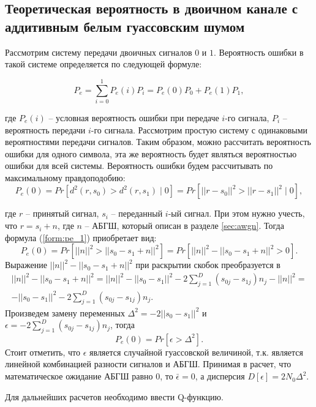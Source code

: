 \subsection{Теоретическая вероятность в двоичном канале с аддитивным белым гуассовским шумом}

Рассмотрим систему передачи двоичных сигналов $0$ и $1$. Вероятность ошибки в такой системе определяется по следующей формуле:

\begin{equation}
	P_e = \sum_{i=0}^{1}P_e(i)P_i = P_e(0)P_0 + P_e(1)P_1,
\end{equation}

где $P_e(i)$ -- условная вероятность ошибки при передаче $i$-го сигнала, $P_i$ -- вероятность передачи $i$-го сигнала. Рассмотрим простую систему с одинаковыми вероятностями передачи сигналов. Таким образом, можно рассчитать вероятность ошибки для одного символа, эта же вероятность будет являться вероятностью ошибки для всей системы. Вероятность ошибки будем рассчитывать по максимальному правдоподобию:
\begin{equation}
	\label{form:pe_1}
	P_e(0) = Pr[d^2(r,s_0) > d^2(r,s_1) \mid 0] = Pr[ || r - s_0||^2 > ||r - s_1||^2 \mid 0] ,
\end{equation}

где $r$ -- принятый сигнал, $s_i$ -- переданный $i$-ый сигнал. При этом нужно учесть, что $r = s_i + n$, где $n$ -- АБГШ, который описан в разделе \ref{sec:awgn}. Тогда формула (\ref{form:pe_1}) приобретает вид:
\begin{equation}
	P_e(0) = Pr[||n||^2 > ||s_0 - s_1 + n||^2] = Pr[||n||^2 - ||s_0 - s_1 + n||^2 > 0].
\end{equation}
Выражение $||n||^2 - ||s_0 - s_1 + n||^2$ при раскрытии скобок преобразуется в 
\begin{equation}
\begin{split}
	||n||^2 - ||s_0 - s_1 + n||^2 = ||n||^2 - ||s_0 - s_1||^2 - 2\sum_{j=1}^{D}(s_{0j} - s_{1j}) n_j - ||n||^2 = \\
	 - ||s_0 - s_1||^2 - 2\sum_{j=1}^{D}(s_{0j} - s_{1j}) n_j.
\end{split}
\end{equation}
Произведем замену переменных $\Delta^2 =-2||s_0 - s_1||^2$ и $\epsilon =  -2\sum_{j=1}^{D}(s_{0j} - s_{1j}) n_j$, тогда 
\begin{equation}
	P_e(0) = Pr[\epsilon > \Delta^2].
\end{equation}
Стоит отметить, что $\epsilon$ является случайной гуассовской величиной, т.к. является линейной комбинацией разности сигналов и АБГШ. Принимая в расчет, что математическое ожидание АБГШ равно $0$, то $\bar{\epsilon} = 0$, а дисперсия $D[\epsilon] = 2N_0\Delta^2$.

Для дальнейших расчетов необходимо ввести Q-функцию.
